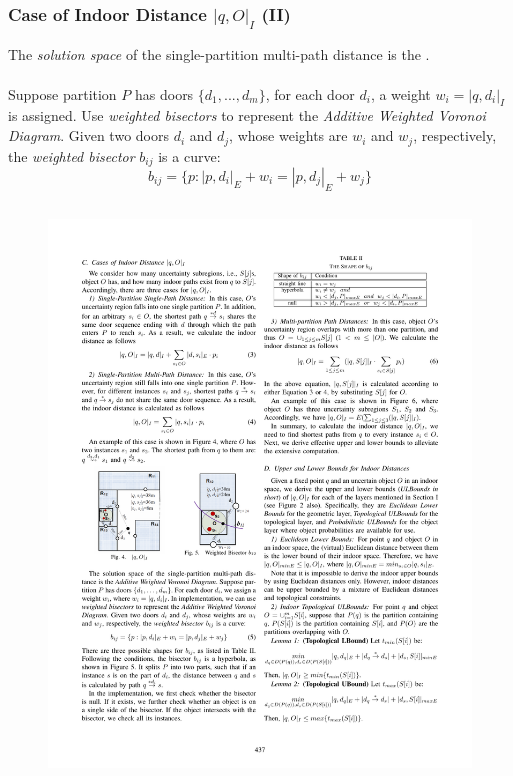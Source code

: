 
\begin{frame}
\frametitle{Case of Indoor Distance $|q, O|_I$ (II)}

The \emph{solution space} of the single-partition multi-path distance is the .\\~\\

Suppose partition $P$ has doors $\{d_1, ..., d_m\}$, for each door $d_i$, a weight $w_i = |q, d_i|_I$ is assigned. Use \emph{weighted bisectors} to represent the \emph{Additive Weighted Voronoi Diagram}. Given two doors $d_i$ and $d_j$, whose weights are $w_i$ and $w_j$, respectively, the \emph{weighted bisector} $b_{ij}$ is a curve:
\begin{equation}
  b_{ij} = \{ p : |p,d_i|_E + w_i = |p,d_j|_E + w_j \}
\end{equation}

\vspace{-20pt}
\begin{columns}[c]

  \begin{figure}[tb]
    \includegraphics[width=\columnwidth]{figures/2-6/2-6-4.pdf}
  \end{figure}


\end{columns}
\end{frame}
